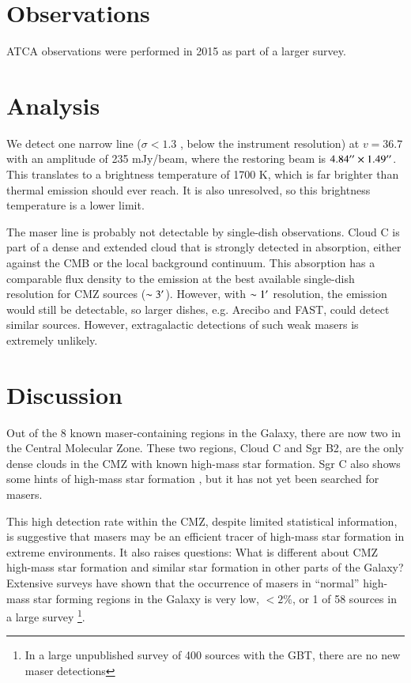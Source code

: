 \documentclass{aa}
\begin{document}
\section{Observations}
ATCA observations were performed in 2015 as part of a larger survey.

\section{Analysis}
We detect one narrow line ($\sigma<1.3$ \kms, below the instrument resolution)
at $v=36.7$ \kms with an amplitude of 235 mJy/beam, where the restoring beam is
$4.84\mbox{$^{\prime\prime}$}\times1.49\mbox{$^{\prime\prime}$}$.  This translates to a brightness temperature of
1700 K, which is far brighter than thermal \formaldehyde emission should ever
reach.  It is also unresolved, so this brightness temperature is a lower limit.

The maser line is probably not detectable by single-dish observations.  Cloud C
is part of a dense and extended cloud that is strongly detected in absorption,
either against the CMB or the local background continuum.  This absorption has
a comparable flux density to the emission at the best available single-dish resolution
for CMZ sources ($\sim3\mbox{$^\prime$}$).  However, with $\sim1\mbox{$^\prime$}$ resolution, the 
emission would still be detectable, so larger dishes, e.g. Arecibo and FAST,
could detect similar sources.  However, extragalactic detections of such weak
masers is extremely unlikely.

\section{Discussion}
Out of the 8 known maser-containing regions in the Galaxy, there are now two in
the Central Molecular Zone.  These two regions, Cloud C and Sgr B2, are the only
dense clouds in the CMZ with known high-mass star formation.  Sgr C also shows
some hints of high-mass star formation \citep{Kendrew2013a}, but it has not yet
been searched for \formaldehyde masers.

This high detection rate within the CMZ, despite limited statistical
information, is suggestive that \formaldehyde masers may be an efficient tracer
of high-mass star formation in extreme environments.
It also raises questions: What is different about CMZ high-mass star formation and
similar star formation in other parts of the Galaxy?  Extensive surveys have shown
that the occurrence of \formaldehyde masers in ``normal'' high-mass star
forming regions in the Galaxy is very low, $<2\%$, or 1 of 58 sources in a
large survey \citep{Araya2004a,Araya2007b,Araya2008a}\footnote{In a large unpublished survey
of 400 sources with the GBT, there are no new maser detections}.  
\end{document}
